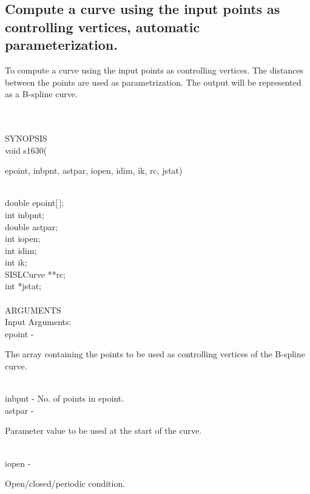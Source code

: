 \subsection{Compute a curve using the input points as
controlling \mbox{vertices}, automatic parameterization.}
\begin{minipg1}
  To compute a curve using the input points as controlling
  vertices. The distances between the points are used as
  parametrization.
  The output will be represented as a B-spline curve.
\end{minipg1}\\ \\
SYNOPSIS\\
        \>void s1630(\begin{minipg3}
          {\fov epoint}, {\fov inbpnt}, {\fov astpar}, {\fov iopen}, {\fov idim}, {\fov ik}, {\fov rc}, {\fov jstat})
        \end{minipg3}\\[0.3ex]
        \>\> double \>  {\fov epoint}[\,];\\
        \>\> int    \>  {\fov inbpnt};\\
        \>\> double \>  {\fov astpar};\\
        \>\> int    \>  {\fov iopen};\\
        \>\> int    \>  {\fov idim};\\
        \>\> int    \>  {\fov ik};\\
        \>\> SISLCurve \> **{\fov rc};\\
        \>\> int    \>  *{\fov jstat};\\
\\
ARGUMENTS\\
        \>Input Arguments:\\
        \>\>    {\fov epoint} \> - \>
        \begin{minipg2}
          The array containing the points to be used as
          controlling vertices of the B-spline curve.
        \end{minipg2}\\[0.8ex]
        \>\>    {\fov inbpnt} \> - \> No. of points in epoint.\\
        \>\>    {\fov astpar} \> - \>
        \begin{minipg2}
          Parameter value to be used at the start of the curve.
        \end{minipg2}\\[0.8ex]
        \>\>    {\fov iopen} \> - \>
        \begin{minipg2}
          Open/closed/periodic condition.
        \end{minipg2}\\[0.8ex]
